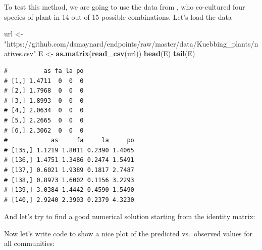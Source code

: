 \documentclass[
]{book}
\newenvironment{Shaded}{\begin{snugshade}}{\end{snugshade}}
\newcommand{\DataTypeTok}[1]{\textcolor[rgb]{0.13,0.29,0.53}{#1}}
\newcommand{\DecValTok}[1]{\textcolor[rgb]{0.00,0.00,0.81}{#1}}
\newcommand{\KeywordTok}[1]{\textcolor[rgb]{0.13,0.29,0.53}{\textbf{#1}}}
\newcommand{\NormalTok}[1]{#1}
\newcommand{\OperatorTok}[1]{\textcolor[rgb]{0.81,0.36,0.00}{\textbf{#1}}}
\newcommand{\StringTok}[1]{\textcolor[rgb]{0.31,0.60,0.02}{#1}}
\begin{document}
To test this method, we are going to use the data from \citet{kuebbing2015above}, who co-cultured four species of plant in 14 out of 15 possible combinations. Let's load the data

\begin{Shaded}
\begin{Highlighting}[]
\NormalTok{url <-}\StringTok{ "https://github.com/dsmaynard/endpoints/raw/master/data/Kuebbing_plants/natives.csv"}
\NormalTok{E <-}\StringTok{ }\KeywordTok{as.matrix}\NormalTok{(}\KeywordTok{read_csv}\NormalTok{(url))}
\KeywordTok{head}\NormalTok{(E)}
\KeywordTok{tail}\NormalTok{(E)}
\end{Highlighting}
\end{Shaded}

\begin{verbatim}
#          as fa la po
# [1,] 1.4711  0  0  0
# [2,] 1.7968  0  0  0
# [3,] 1.8993  0  0  0
# [4,] 2.0634  0  0  0
# [5,] 2.2665  0  0  0
# [6,] 2.3062  0  0  0
#            as     fa     la     po
# [135,] 1.1219 1.8011 0.2390 1.4065
# [136,] 1.4751 1.3486 0.2474 1.5491
# [137,] 0.6021 1.9389 0.1817 2.7487
# [138,] 0.8973 1.6002 0.1156 3.2293
# [139,] 3.0384 1.4442 0.4590 1.5490
# [140,] 2.9240 2.3903 0.2379 4.3230
\end{verbatim}

And let's try to find a good numerical solution starting from the identity matrix:

\begin{Shaded}
\end{Shaded}

Now let's write code to show a nice plot of the predicted vs.~observed values for all communities:
\end{document}
